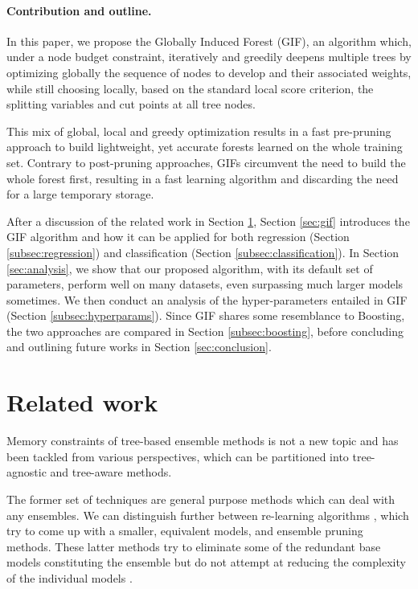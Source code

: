 \documentclass{article}
\begin{document}
\vspace*{-\baselineskip}

\paragraph{Contribution and outline.}
In this paper, we propose the Globally Induced Forest (GIF), an algorithm 
which, under a node budget constraint, iteratively and greedily deepens 
multiple 
trees by optimizing globally the sequence of nodes to develop and their 
associated weights, while still choosing locally, based on the standard local 
score criterion, the splitting variables and cut points at all tree nodes. 

This mix of global, local and greedy optimization results in a fast pre-pruning 
approach to build lightweight, yet accurate forests learned on the whole 
training set. Contrary to post-pruning approaches, GIFs circumvent the need to 
build the whole forest first, resulting in a fast learning algorithm and 
discarding the need for a large temporary storage.

After a discussion of the related work in Section \ref{sec:relatedWork},
Section \ref{sec:gif} introduces the GIF algorithm and how it can be applied
for both regression (Section \ref{subsec:regression}) and classification
(Section \ref{subsec:classification}).  In Section \ref{sec:analysis}, we show
that our proposed algorithm, with its default set of parameters, perform well
on many datasets, even surpassing much larger models sometimes. We then conduct
an analysis of the hyper-parameters entailed in GIF (Section
\ref{subsec:hyperparams}). Since GIF shares some resemblance to Boosting, the
two approaches are compared in Section \ref{subsec:boosting}, before concluding
and outlining future works in Section \ref{sec:conclusion}.


\section{Related work}
\label{sec:relatedWork}
Memory constraints of tree-based ensemble methods is not a new topic and has 
been tackled from various perspectives, which can be partitioned into 
tree-agnostic and tree-aware methods.

The former set of techniques are general purpose methods which can deal with
any ensembles. We can distinguish further between re-learning algorithms
\citep[e.g.][]{domingos1997oracle,menke2009oracle}, which try to come up with a
smaller, equivalent models, and ensemble pruning methods. These latter methods
try to eliminate some of the redundant base models constituting the ensemble
but do not attempt at reducing the complexity of the individual models 
\citep[see ][ for a review of these 
methods]{tsoumakas2008enspruning,rokach2016enspruning}.
\end{document}
